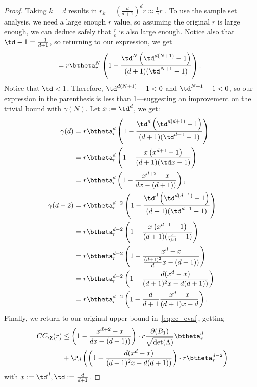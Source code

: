 \begin{proof}
Taking $k=d$ results in $r_k=(\frac{d}{d+1})^dr\approx\frac{1}{e}r$ . To use the sample set analysis, we need a large enough $r$ value, so assuming the original $r$ is large enough, we can deduce safely that $\frac{r}{e}$ is also large enough. Notice also that $\td - 1 = \frac{-1}{d+1}$, so returning to our expression, we get
\begin{align*}
      &= r \btheta^N_{r} \left(1 - \frac{\td^N\left(\td^{d(N+1)} - 1\right)}{(d+1)(\td^{N+1} - 1)}\right).
\end{align*}
Notice that $\td < 1$. Therefore, $\td^{d(N+1)}-1 < 0$ and $\td^{N+1} - 1 < 0$, so our expression in the parenthesis is less than 1---suggesting an improvement on the trivial bound with $\gamma(N)$.
Let $x:=\td^d$, we get:
\begin{align*}
    \gamma(d)&=r \btheta^d_{r} \left(1 - \frac{\td^d\left(\td^{d(d+1)} - 1\right)}{(d+1)(\td^{d+1} - 1)}\right)\\
    &= r \btheta^d_{r} \left(1 - \frac{x\left(x^{d+1} - 1\right)}{(d+1)(\td x - 1)}\right)\nonumber\\
    &= r \btheta^d_{r} \left(1 - \frac{x^{d+2} - x}{ dx - (d+1))}\right),\\
    \gamma(d-2)&=r \btheta^{d-2}_{r} \left(1 - \frac{\td^d\left(\td^{d(d-1)} - 1\right)}{(d+1)(\td^{d-1} - 1)}\right)\\
    &= r \btheta^{d-2}_{r} \left(1 - \frac{x\left(x^{d-1} - 1\right)}{(d+1)(\frac{x}{\td} - 1)}\right)\nonumber\\
    &= r \btheta^{d-2}_{r} \left(1 - \frac{x^d - x}{ \frac{(d+1)^2}{d}x - (d+1))}\right)\nonumber\\
    &= r \btheta^{d-2}_{r} \left(1 - \frac{d(x^d - x)}{ (d+1)^2x - d(d+1))}\right) \nonumber\\
    &= r \btheta^{d-2}_{r} \left(1 - \frac{d}{d+1}\frac{x^d - x}{ (d+1)x - d}\right).
\end{align*}
Finally, we return to our original upper bound in~\ref{eq:cc_eval}, getting
\begin{align*}
    CC_\X(r)&\leq \left(1 - \frac{x^{d+2} - x}{ dx - (d+1))}\right)\cdot r \frac{\partial(B_1)}{\sqrt{\det(\Lambda)}}\btheta^d_{r}  \\&+ \P_d\left(\left(1 - \frac{d(x^d - x)}{ (d+1)^2x - d(d+1))}\right)\cdot r \btheta^{d-2}_{r} \right)
\end{align*}
with $x:=\td^d, \td:=\frac{d}{d+1}$.


\end{proof}

